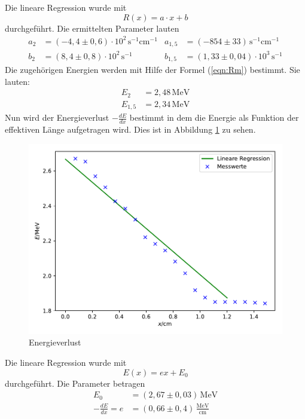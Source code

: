 Die lineare Regression wurde mit
\begin{equation*}
R(x) = a\cdot x +b
\end{equation*}
durchgeführt.
Die ermittelten Parameter lauten
\begin{align*}
  a_2&=(-4,4\pm0,6)\cdot10^2 \,\mathrm{s^{-1}cm^{-1}}& a_{1,5}&= (-854\pm33)\,\mathrm{s^{-1}cm^{-1}}\\
  b_2&=(8,4\pm0,8)\cdot10^2\,\mathrm{s^{-1}} & b_{1,5}&= (1,33\pm0,04)\cdot 10^3\,\mathrm{s^{-1}}
\end{align*}
Die zugehörigen Energien werden mit Hilfe der Formel (\ref{eqn:Rm}) bestimmt.
Sie lauten:
\begin{align*}
  E_{2} &= 2,48\,\mathrm{MeV}\\
  E_{1,5} &= 2,34\,\mathrm{MeV}
\end{align*}
Nun wird der Energieverlust $-\frac{dE}{dx}$ bestimmt in dem die Energie
als Funktion der effektiven Länge aufgetragen wird.
Dies ist in Abbildung \ref{fig:dedx} zu sehen.
\begin{figure}[H]
\centering
\includegraphics[width=\textwidth]{Messung1c.pdf}
\caption{Energieverlust}
\label{fig:dedx}
\end{figure}
Die lineare Regression wurde mit
\begin{equation*}
  E(x)=ex+E_0
\end{equation*}
durchgeführt.
Die Parameter betragen
\begin{align*}
  E_0 &= (2,67\pm 0,03)\, \mathrm{MeV}\\
  -\frac{dE}{dx}= e &= (0,66\pm 0,4)\,\mathrm{\frac{MeV}{cm}}
\end{align*}
